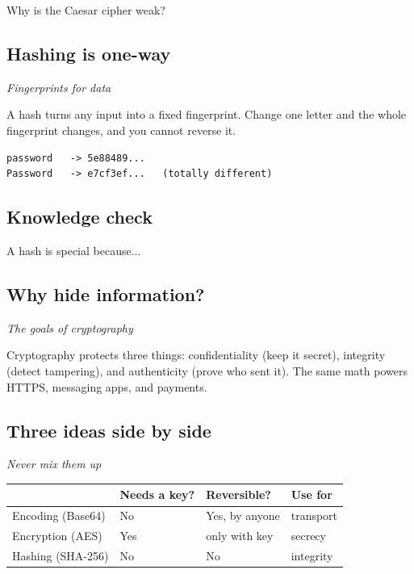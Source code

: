 \documentclass[12pt,openany]{book}
\begin{document}
Why is the Caesar cipher weak?

\medskip

\subsection*{Hashing is one-way}
{\small\itshape\color{gray}Fingerprints for data}


A hash turns any input into a fixed fingerprint. Change one letter and the whole fingerprint changes, and you cannot reverse it.

\begin{lstlisting}
password   -> 5e88489...
Password   -> e7cf3ef...   (totally different)\end{lstlisting}

\medskip

\subsection*{Knowledge check}

A hash is special because...

\medskip

\subsection*{Why hide information?}
{\small\itshape\color{gray}The goals of cryptography}


Cryptography protects three things: confidentiality (keep it secret), integrity (detect tampering), and authenticity (prove who sent it). The same math powers HTTPS, messaging apps, and payments.

\medskip

\subsection*{Three ideas side by side}
{\small\itshape\color{gray}Never mix them up}


\begin{center}\small\begin{tabular}{p{3.2cm}p{3.2cm}p{3.2cm}p{3.2cm}}\toprule
\textbf{} & \textbf{Needs a key?} & \textbf{Reversible?} & \textbf{Use for} \\ \midrule
Encoding (Base64) & No & Yes, by anyone & transport \\
Encryption (AES) & Yes & only with key & secrecy \\
Hashing (SHA-256) & No & No & integrity \\
\bottomrule\end{tabular}\end{center}
\end{document}
